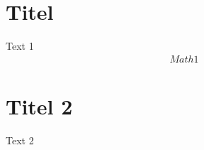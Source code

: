 \documentclass[10pt,a4paper]{article}
\begin{document}
	\begin{landscape}
		\begin{multicols*}{3}
			\section{Titel}
				\begin{mdframed}[style=default]
					Text 1
					\begin{align*}
						Math 1
					\end{align*}
				\end{mdframed}
			\section{Titel 2}
				\begin{mdframed}[style=default]
					Text 2
				\end{mdframed}
		\end{multicols*}
	\end{landscape}
\end{document}
